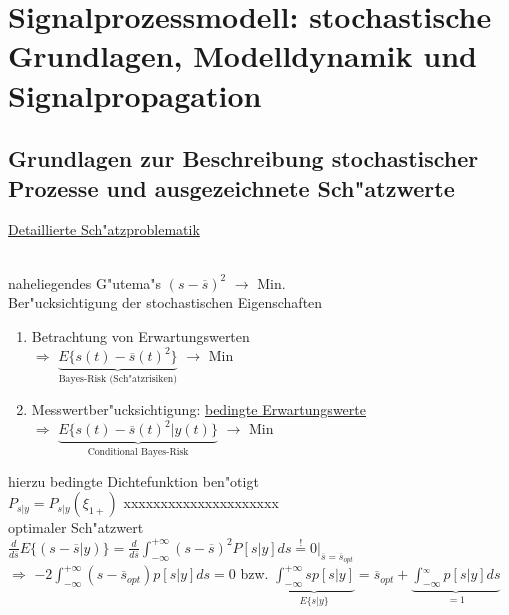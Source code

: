 \documentclass[openany,a4paper,11pt]{book}
\begin{document}
\section{Signalprozessmodell: stochastische Grundlagen, Modelldynamik und Signalpropagation}
\subsection{Grundlagen zur Beschreibung stochastischer Prozesse und ausgezeichnete Sch"atzwerte}
\uline{Detaillierte Sch"atzproblematik}\\
\\
naheliegendes G"utema"s $(s-\overline{s})^2$ $\rightarrow$ Min.\\
Ber"ucksichtigung der stochastischen Eigenschaften\begin{enumerate}
    \item Betrachtung von Erwartungswerten\\
    $\Rightarrow$ $\underbrace{E\{s(t)-\overline{s}(t)^2\}}_{\text{Bayes-Risk (Sch"atzrisiken)}}$ $\rightarrow$ Min
    \item Messwertber"ucksichtigung: \uline{bedingte Erwartungswerte}\\
    $\Rightarrow$ $\underbrace{E\{s(t)-\overline{s}(t)^2|y(t)\}}_{\text{Conditional Bayes-Risk}}$ $\rightarrow$ Min
\end{enumerate}
hierzu bedingte Dichtefunktion ben"otigt\\
$P_{s|y}=P_{s|y}(\xi_{1+})$ xxxxxxxxxxxxxxxxxxxxx\\
optimaler Sch"atzwert\\
$\displaystyle\frac{d}{d\overline{s}}E\{(s-\overline{s}|y)\}=\frac{d}{d\overline{s}}\int_{-\infty}^{+\infty}(s-\overline{s})^2P[s|y]ds\stackrel{!}{=}0\bigg|_{\overline{s}=\overline{s}_{opt}}$\\
$\Rightarrow$ $\displaystyle-2\int_{-\infty}^{+\infty}(s-\overline{s}_{opt})p[s|y]ds=0$ bzw. $\displaystyle\underbrace{\int_{-\infty}^{+\infty}sp[s|y]}_{E\{s|y\}}=\overline{s}_{opt}+\underbrace{\int_{-\infty}^{_\infty}p[s|y]ds}_{=1}$\\
\end{document}
